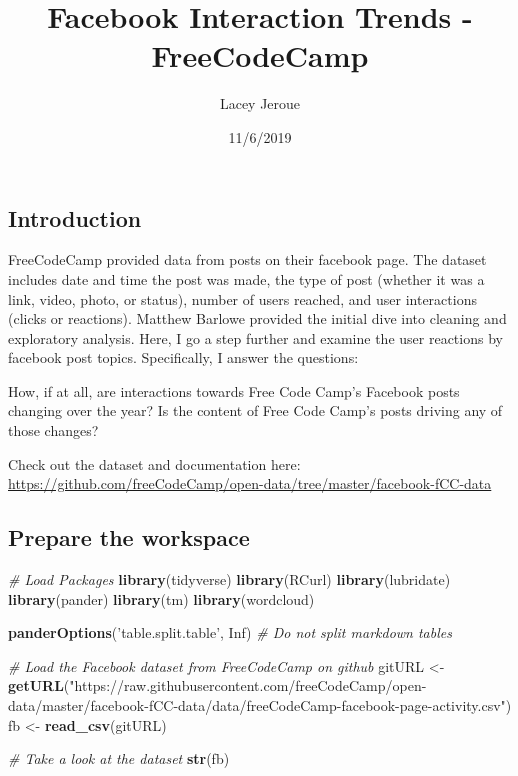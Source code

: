 \documentclass[
]{article}
\title{Facebook Interaction Trends - FreeCodeCamp}
\author{Lacey Jeroue}
\date{11/6/2019}
\newenvironment{Shaded}{\begin{snugshade}}{\end{snugshade}}
\newcommand{\CommentTok}[1]{\textcolor[rgb]{0.56,0.35,0.01}{\textit{#1}}}
\newcommand{\KeywordTok}[1]{\textcolor[rgb]{0.13,0.29,0.53}{\textbf{#1}}}
\newcommand{\NormalTok}[1]{#1}
\newcommand{\OtherTok}[1]{\textcolor[rgb]{0.56,0.35,0.01}{#1}}
\newcommand{\StringTok}[1]{\textcolor[rgb]{0.31,0.60,0.02}{#1}}
\begin{document}
\maketitle

\hypertarget{introduction}{%
\subsection{Introduction}\label{introduction}}

FreeCodeCamp provided data from posts on their facebook page. The
dataset includes date and time the post was made, the type of post
(whether it was a link, video, photo, or status), number of users
reached, and user interactions (clicks or reactions). Matthew Barlowe
provided the initial dive into cleaning and exploratory analysis. Here,
I go a step further and examine the user reactions by facebook post
topics. Specifically, I answer the questions:

How, if at all, are interactions towards Free Code Camp's Facebook posts
changing over the year? Is the content of Free Code Camp's posts driving
any of those changes?

Check out the dataset and documentation here:
\url{https://github.com/freeCodeCamp/open-data/tree/master/facebook-fCC-data}

\hypertarget{prepare-the-workspace}{%
\subsection{Prepare the workspace}\label{prepare-the-workspace}}

\begin{Shaded}
\begin{Highlighting}[]
\CommentTok{# Load Packages}
\KeywordTok{library}\NormalTok{(tidyverse)}
\KeywordTok{library}\NormalTok{(RCurl)}
\KeywordTok{library}\NormalTok{(lubridate)}
\KeywordTok{library}\NormalTok{(pander)}
\KeywordTok{library}\NormalTok{(tm)}
\KeywordTok{library}\NormalTok{(wordcloud)}

\KeywordTok{panderOptions}\NormalTok{(}\StringTok{'table.split.table'}\NormalTok{, }\OtherTok{Inf}\NormalTok{)  }\CommentTok{# Do not split markdown tables}

\CommentTok{# Load the Facebook dataset from FreeCodeCamp on github}
\NormalTok{gitURL <-}\StringTok{ }\KeywordTok{getURL}\NormalTok{(}\StringTok{"https://raw.githubusercontent.com/freeCodeCamp/open-data/master/facebook-fCC-data/data/freeCodeCamp-facebook-page-activity.csv"}\NormalTok{)}
\NormalTok{fb <-}\StringTok{ }\KeywordTok{read_csv}\NormalTok{(gitURL)}

\CommentTok{# Take a look at the dataset}
\KeywordTok{str}\NormalTok{(fb)}
\end{Highlighting}
\end{Shaded}
\end{document}
